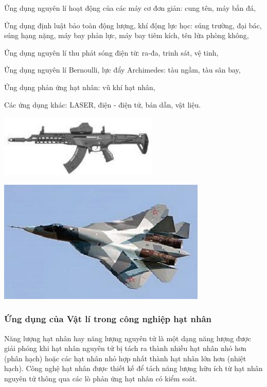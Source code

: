 \begin{minipage}[l]{0.6\textwidth}
Ứng dụng nguyên lí hoạt động của các máy cơ đơn giản: cung tên, máy bắn đá,

Ứng dụng định luật bảo toàn động lượng, khí động lực học: súng trường, đại bác, súng hạng nặng, máy bay phản lực, máy bay tiêm kích, tên lửa phòng không,

Ứng dụng nguyên lí thu phát sóng điện từ: ra-đa, trinh sát, vệ tinh,

Ứng dụng nguyên lí Bernoulli, lực đẩy Archimedes: tàu ngầm, tàu sân bay,

Ứng dụng phản ứng hạt nhân: vũ khí hạt nhân,

Các ứng dụng khác: LASER, điện - điện tử, bán dẫn, vật liệu.
\end{minipage}
\begin{minipage}[r]{0.4\textwidth}
\begin{center}
	\includegraphics[scale=0.8]{../figs/G10-003-1.png}
\end{center}
\begin{center}
	\includegraphics[scale=0.8]{../figs/G10-003-2.png}
\end{center}
\end{minipage}
\subsubsection{Ứng dụng của Vật lí trong công nghiệp hạt nhân}
Năng lượng hạt nhân hay năng lượng nguyên tử là một dạng năng lượng được giải phóng khi hạt nhân nguyên tử bị tách ra thành nhiều hạt nhân nhỏ hơn (phân hạch) hoặc các hạt nhân nhỏ hợp nhất thành hạt nhân lớn hơn (nhiệt hạch). Công nghệ hạt nhân được thiết kế để tách năng lượng hữu ích từ hạt nhân nguyên tử thông qua các lò phản ứng hạt nhân có kiểm soát.

